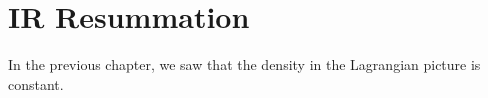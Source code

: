 
\chapter{IR Resummation}
In the previous chapter, we saw that the density in the Lagrangian picture is constant.
